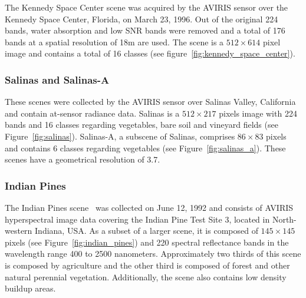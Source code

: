 \documentclass[remotesensing,article,submit,moreauthors,pdftex]{Definitions/mdpi}
\begin{document}
\begin{paracol}{2}
The Kennedy Space Center scene was acquired by the AVIRIS sensor over the
Kennedy Space Center, Florida, on March 23, 1996. Out of the original 224
bands, water absorption and low SNR bands were removed and a total of 176
bands at a spatial resolution of 18m are used. The scene is a $512 \times 614$
pixel image and contains a total of 16 classes (see
figure~\ref{fig:kennedy_space_center}).

\subsubsection*{Salinas and Salinas-A}

These scenes were collected by the AVIRIS sensor over Salinas Valley,
California and contain at-sensor radiance data. Salinas is a $512 \times 217$
pixels image with 224 bands and 16 classes regarding vegetables, bare soil and
vineyard fields (see Figure~\ref{fig:salinas}). Salinas-A, a subscene of
Salinas, comprises $86 \times 83$ pixels and contains 6 classes regarding
vegetables (see Figure~\ref{fig:salinas_a}). These scenes have a geometrical
resolution of 3.7.

\subsubsection*{Indian Pines} 

The Indian Pines scene~\cite{Baumgardner2015} was collected on June 12, 1992
and consists of AVIRIS hyperspectral image data covering the Indian Pine Test
Site 3, located in North-western Indiana, USA. As a subset of a larger scene,
it is composed of $145 \times 145$ pixels (see Figure~\ref{fig:indian_pines})
and 220 spectral reflectance bands in the wavelength range 400 to 2500
nanometers. Approximately two thirds of
this scene is composed by agriculture and the other third is composed of
forest and other natural perennial vegetation. Additionally, the scene also
contains low density buildup areas.

\pagebreak
\end{paracol}
\end{document}
